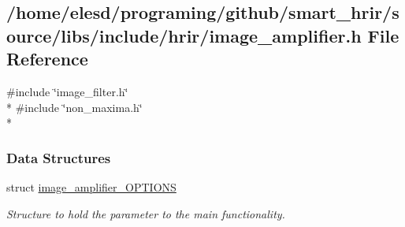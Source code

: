\hypertarget{a00011}{\subsection{/home/elesd/programing/github/smart\-\_\-hrir/source/libs/include/hrir/image\-\_\-amplifier.h File Reference}
\label{a00011}
}
{\ttfamily \#include \char`\"{}image\-\_\-filter.\-h\char`\"{}}\\*
{\ttfamily \#include \char`\"{}non\-\_\-maxima.\-h\char`\"{}}\\*
\subsubsection*{Data Structures}
\begin{DoxyCompactItemize}
\item 
struct \hyperlink{a00002}{image\-\_\-amplifier\-\_\-\-O\-P\-T\-I\-O\-N\-S}
\begin{DoxyCompactList}\small\item\em Structure to hold the parameter to the main functionality. \end{DoxyCompactList}\end{DoxyCompactItemize}
